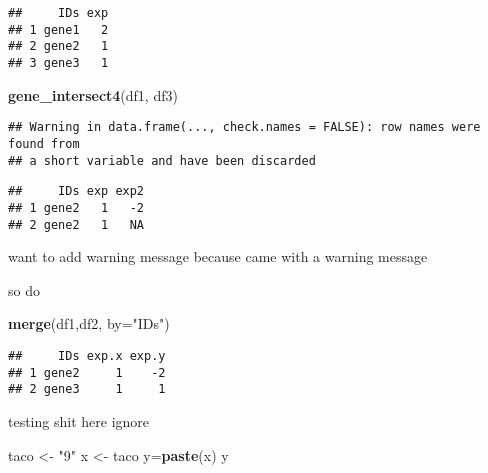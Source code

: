 \documentclass[]{article}
\newenvironment{Shaded}{\begin{snugshade}}{\end{snugshade}}
\newcommand{\KeywordTok}[1]{\textcolor[rgb]{0.13,0.29,0.53}{\textbf{#1}}}
\newcommand{\DataTypeTok}[1]{\textcolor[rgb]{0.13,0.29,0.53}{#1}}
\newcommand{\StringTok}[1]{\textcolor[rgb]{0.31,0.60,0.02}{#1}}
\newcommand{\NormalTok}[1]{#1}
\begin{document}
\begin{verbatim}
##     IDs exp
## 1 gene1   2
## 2 gene2   1
## 3 gene3   1
\end{verbatim}

\begin{Shaded}
\begin{Highlighting}[]
\KeywordTok{gene_intersect4}\NormalTok{(df1, df3)}
\end{Highlighting}
\end{Shaded}

\begin{verbatim}
## Warning in data.frame(..., check.names = FALSE): row names were found from
## a short variable and have been discarded
\end{verbatim}

\begin{verbatim}
##     IDs exp exp2
## 1 gene2   1   -2
## 2 gene2   1   NA
\end{verbatim}

want to add warning message because came with a warning message

so do

\begin{Shaded}
\begin{Highlighting}[]
\KeywordTok{merge}\NormalTok{(df1,df2, }\DataTypeTok{by=}\StringTok{"IDs"}\NormalTok{)}
\end{Highlighting}
\end{Shaded}

\begin{verbatim}
##     IDs exp.x exp.y
## 1 gene2     1    -2
## 2 gene3     1     1
\end{verbatim}

testing shit here ignore

\begin{Shaded}
\end{Shaded}

\begin{Shaded}
\begin{Highlighting}[]
\NormalTok{taco <-}\StringTok{ "9"}
\NormalTok{x <-}\StringTok{ }\NormalTok{taco}
\NormalTok{y=}\KeywordTok{paste}\NormalTok{(x)}
\NormalTok{y}
\end{Highlighting}
\end{Shaded}
\end{document}
